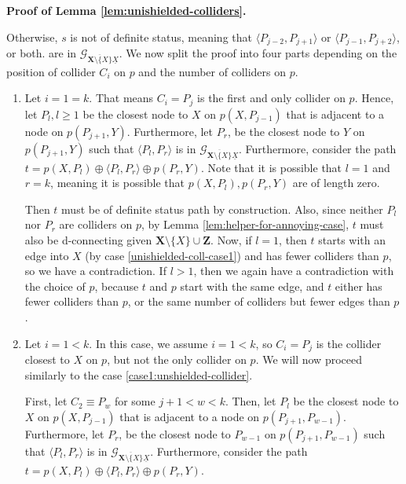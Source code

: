 \documentclass[11pt]{article}
\newcommand{\mb}[1]{\mathbf{#1}}
\newcommand{\g}[1][G]{\mathcal{#1}}
\newenvironment{proofofnoqed}[1][]{\noindent \textbf{Proof of #1.}}{}
\begin{document}
\begin{proofofnoqed}[Lemma \ref{lem:unishielded-colliders}]
\begin{enumerate}[label = (\roman*)]
        Otherwise, $s$ is not of definite status, meaning that $\langle P_{j-2}, P_{j+1} \rangle$ or $\langle P_{j-1}, P_{j+2} \rangle$, or both. are in $\g_{\overline{\mb{X} \setminus \{X\}} \underline{X}}$. We now split the proof into four parts depending on the position of collider $C_i$ on $p$ and the number of colliders on $p$.
        \begin{enumerate}[label = (\arabic*)]
            \item\label{case1:unshielded-collider}
            Let $i = 1 = k$. That means $C_i = P_j$ is the first and only collider on $p$. Hence, let $P_l, l\ge1$ be the closest node to $X$ on $p(X,P_{j-1})$ that is adjacent to a node on $p(P_{j+1},Y)$. Furthermore, let $P_r$, be the closest node to $Y$ on $p(P_{j+1}, Y)$ such that $\langle P_l, P_{r} \rangle$ is in $\g_{\overline{\mb{X} \setminus \{X\}} \underline{X}}$. Furthermore, consider the path $t = p(X,P_l) \oplus \langle P_l, P_r \rangle \oplus p(P_r, Y)$. Note that it is possible that $l =1$ and $r = k$, meaning it is possible that $p(X,P_l), p(P_r, Y)$ are of length zero.

            Then $t$ must be of definite status path by construction. Also, since neither $P_l$ nor $P_r$ are colliders on $p$, by Lemma \ref{lem:helper-for-annoying-case}, $t$ must also be d-connecting given $\mb{X} \setminus \{X\} \cup \mb{Z}$. Now, if $l = 1$, then $t$ starts with an edge into $X$ (by case \ref{unishielded-coll-case1}) and has fewer colliders than $p$, so we have a contradiction. If $l > 1$, then we again have a contradiction with the choice of $p$, because $t$ and $p$ start with the same edge, and $t$ either has fewer colliders than $p$, or the same number of colliders but fewer edges than $p$. 

            \item\label{case2:unshielded-collider}
            Let $i = 1 < k$. In this case, we assume $i = 1 < k$, so $C_i = P_j$ is the collider closest to $X$ on $p$, but not the only collider on $p$. We will now proceed similarly to the case \ref{case1:unshielded-collider}. 

            First, let $C_2 \equiv P_w$ for some $j +1<w<k$. Then, let $P_l$ be the closest node to $X$ on $p(X,P_{j-1})$ that is adjacent to a node on $p(P_{j+1},P_{w-1})$. Furthermore, let $P_r$, be the closest node to $P_{w-1}$ on $p(P_{j+1}, P_{w-1})$ such that $\langle P_l, P_{r} \rangle$ is in $\g_{\overline{\mb{X} \setminus \{X\}} \underline{X}}$. Furthermore, consider the path $t = p(X,P_l) \oplus \langle P_l, P_r \rangle \oplus p(P_r, Y)$. 


\end{enumerate}
\end{enumerate}
\end{proofofnoqed}
\end{document}
